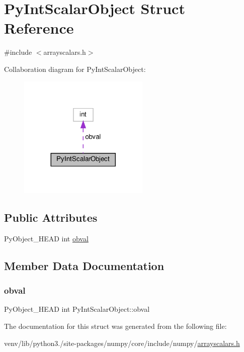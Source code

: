 \hypertarget{structPyIntScalarObject}{}\section{Py\+Int\+Scalar\+Object Struct Reference}
\label{structPyIntScalarObject}


{\ttfamily \#include $<$arrayscalars.\+h$>$}



Collaboration diagram for Py\+Int\+Scalar\+Object\+:
\nopagebreak
\begin{figure}[H]
\begin{center}
\leavevmode
\includegraphics[width=176pt]{structPyIntScalarObject__coll__graph}
\end{center}
\end{figure}
\subsection*{Public Attributes}
\begin{DoxyCompactItemize}
\item 
Py\+Object\+\_\+\+H\+E\+AD int \hyperlink{structPyIntScalarObject_af7a16e9e7e6e25e465c3233756b8fbac}{obval}
\end{DoxyCompactItemize}


\subsection{Member Data Documentation}
\mbox{\label{structPyIntScalarObject_af7a16e9e7e6e25e465c3233756b8fbac}} 
\subsubsection{\texorpdfstring{obval}{obval}}
{\footnotesize\ttfamily Py\+Object\+\_\+\+H\+E\+AD int Py\+Int\+Scalar\+Object\+::obval}



The documentation for this struct was generated from the following file\+:\begin{DoxyCompactItemize}
\item 
venv/lib/python3./site-\/packages/numpy/core/include/numpy/\hyperlink{arrayscalars_8h}{arrayscalars.\+h}\end{DoxyCompactItemize}
